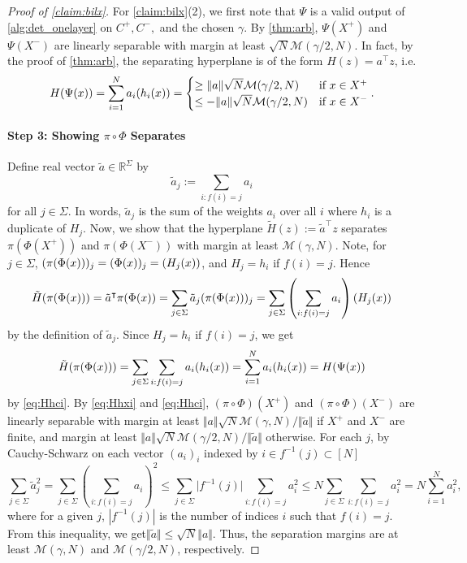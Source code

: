 \documentclass[aoap]{imsart}
\numberwithin{equation}{section}
\theoremstyle{definition}
\theoremstyle{remark}
\newcommand{\R}{\mathbb{R}} %
\numberwithin{equation}{section}
\newcommand{\0}{\mathbf{0}}
\newcommand{\1}{\mathbf{1}}
\let \Re \relax
\DeclareMathOperator{\Re}{ReLU}
\numberwithin{equation}{section}
\begin{document}
\begin{proof}[Proof of \cref{claim:bilx}]
For \cref{claim:bilx}(2), we first note that $\Psi$ is a valid output of \cref{alg:det_onelayer} on $C^+, C^-,$ and the chosen $\gamma$. By \cref{thm:arb}, $\Psi(X^+)$ and $\Psi(X^-)$ are linearly separable with margin at least $\sqrt{N}\mathcal{M}(\gamma/2, N)$. In fact, by the proof of \cref{thm:arb}, the separating hyperplane is of the form $H(z)=a^{\intercal}z$, i.e.
\begin{equation}\label{eq:Hhci}
H(\Psi(x))=\sum_{i=1}^N a_i \Re(h_i(x)) =\begin{cases} \geq \Vert a\Vert \sqrt{N}\mathcal{M}(\gamma/2, N) &\textup{if }x\in X^+ \\ \leq - \Vert a\Vert\sqrt{N} \mathcal{M}(\gamma/2, N) &\textup{if }x\in X^-
\end{cases}.
\end{equation}

\paragraph{Step 3: Showing $\pi\circ\Phi$ Separates}
Define real vector $\tilde{a}\in\R^\Sigma$ by
\[\tilde{a}_j := \sum_{i:f(i)=j}a_i \]
for all $j\in \Sigma$. In words, $\tilde{a}_j$ is the sum of the weights $a_i$ over all $i$ where $h_i$ is a duplicate of $H_j$. Now, we show that the hyperplane $\tilde{H}(z):=\tilde{a}^{\intercal}z$ separates $\pi(\Phi(X^+))$ and $\pi(\Phi(X^-))$ with margin at least $\mathcal{M}(\gamma, N)$. Note, for $j\in\Sigma$, $(\pi(\Phi(x)))_j = (\Phi(x))_j = \Re(H_j(x))$, and $H_j = h_i$ if $f(i)=j$. Hence
\[
    \tilde{H}(\pi(\Phi(x))) = \tilde{a}^{\intercal}\pi(\Phi(x)) = \sum_{j\in\Sigma} \tilde{a}_j(\pi(\Phi(x)))_{j} = \sum_{j\in\Sigma} \left(\sum_{i:f(i)=j}a_i\right)\Re(H_j(x))
\]
by the definition of $\tilde{a}_j$. Since $H_j=h_i$ if $f(i) = j$, we get
\[
\tilde{H}(\pi(\Phi(x))) = \sum_{j\in\Sigma} \sum_{i:f(i)=j}a_i\Re(h_i (x)) = \sum_{i=1}^Na_i\Re(h_i(x)) = H(\Psi(x))
\]
by \eqref{eq:Hhci}. By \eqref{eq:Hhxi} and \eqref{eq:Hhci}, $(\pi\circ \Phi)(X^+)$ and $(\pi\circ \Phi)(X^-)$ are linearly separable with margin at least $\Vert a\Vert \sqrt{N}\mathcal{M}(\gamma, N)/\Vert \tilde{a}\Vert$ if $X^+$ and $X^-$ are finite, and margin at least $\Vert a\Vert \sqrt{N}\mathcal{M}(\gamma/2, N)/\Vert \tilde{a}\Vert$ otherwise. For each $j$, by Cauchy-Schwarz on each vector $(a_i)_i$ indexed by $i\in f^{-1}(j)\subset [N]$
\[ \sum_{j\in\Sigma} \tilde{a}_j^2 = \sum_{j\in\Sigma} \left(\sum_{i:f(i)=j}a_i\right)^2 \leq \sum_{j\in\Sigma} \vert f^{-1}(j)\vert \sum_{i:f(i)=j}a_i^2 \leq N \sum_{j\in\Sigma} \sum_{i:f(i)=j}a_i^2= N \sum_{i=1}^N a_i^2, \]
where for a given $j$, $|f^{-1}(j)|$ is the number of indices $i$ such that $f(i) = j$. From this inequality, we get$\Vert \tilde{a}\Vert \leq \sqrt{N}\Vert a\Vert$. Thus, the separation margins are at least $\mathcal{M}(\gamma, N)$ and $\mathcal{M}(\gamma/2, N)$, respectively.


\end{proof}
\end{document}
